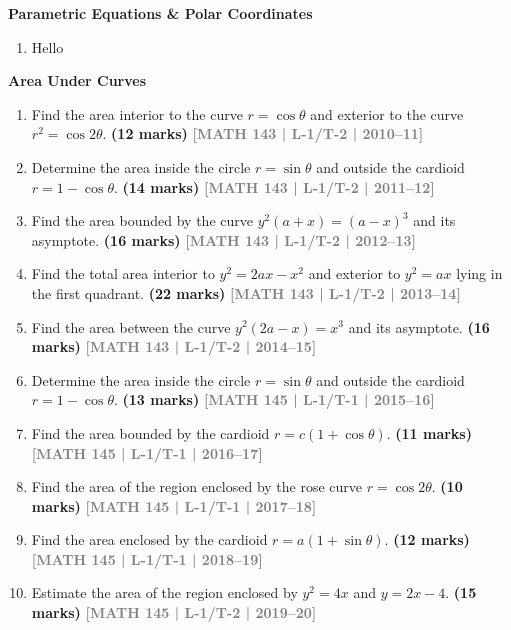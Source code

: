 \documentclass[12pt,a4paper]{article}
\newcommand{\yr}[1]{\hfill\textcolor{gray}{\small\textbf{[#1]}}}
\newcommand{\mk}[1]{\textcolor{orange!70!black}{\small\textbf{(#1 marks)}}}
\newcommand{\subtopic}[2]{%
  \vspace{10pt}
  \noindent\begin{tcolorbox}[colback=#1!8,colframe=#1,boxrule=0.6pt,arc=4pt,
    left=6pt,right=6pt,top=4pt,bottom=4pt]
    \small\bfseries\textcolor{#1}{#2}
  \end{tcolorbox}
  \vspace{2pt}
}
\begin{document}
\subtopic{cB}{Parametric Equations \& Polar Coordinates}
\label{sub:s2-param}

\begin{enumerate}
\item Hello \end{enumerate}

\subtopic{cB}{Area Under Curves}
\label{sub:s2-area}

\begin{enumerate}

\item Find the area interior to the curve $r=\cos\theta$ and exterior to the curve $r^{2}=\cos 2\theta$.
\mk{12} \yr{MATH 143 | L-1/T-2 | 2010--11}

\item Determine the area inside the circle $r=\sin\theta$ and outside the cardioid $r=1-\cos\theta$.
\mk{14} \yr{MATH 143 | L-1/T-2 | 2011--12}

\item Find the area bounded by the curve $y^{2}(a+x)=(a-x)^{3}$ and its asymptote.
\mk{16} \yr{MATH 143 | L-1/T-2 | 2012--13}

\item Find the total area interior to $y^{2}=2ax-x^{2}$ and exterior to $y^{2}=ax$ lying in the first quadrant.
\mk{22} \yr{MATH 143 | L-1/T-2 | 2013--14}

\item Find the area between the curve $y^{2}(2a-x)=x^{3}$ and its asymptote.
\mk{16\textonehalf} \yr{MATH 143 | L-1/T-2 | 2014--15}

\item Determine the area inside the circle $r=\sin\theta$ and outside the cardioid $r=1-\cos\theta$.
\mk{13} \yr{MATH 145 | L-1/T-1 | 2015--16}

\item Find the area bounded by the cardioid $r=c(1+\cos\theta)$.
\mk{11} \yr{MATH 145 | L-1/T-1 | 2016--17}

\item Find the area of the region enclosed by the rose curve $r=\cos 2\theta$.
\mk{10} \yr{MATH 145 | L-1/T-1 | 2017--18}

\item Find the area enclosed by the cardioid $r=a(1+\sin\theta)$.
\mk{12} \yr{MATH 145 | L-1/T-1 | 2018--19}

\item Estimate the area of the region enclosed by $y^{2}=4x$ and $y=2x-4$.
\mk{15} \yr{MATH 145 | L-1/T-2 | 2019--20}


\end{enumerate}
\end{document}
